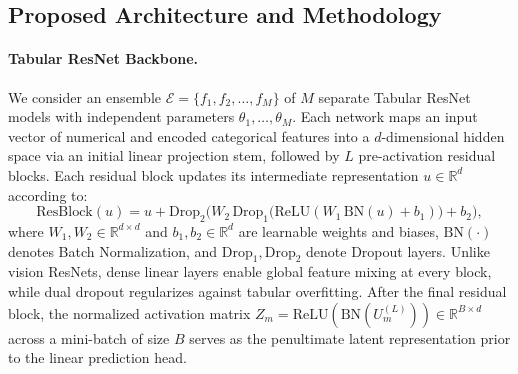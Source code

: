 \documentclass[11pt, a4paper]{article}
\begin{document}
\subsection{Proposed Architecture and Methodology}

\paragraph{Tabular ResNet Backbone.}
We consider an ensemble $\mathcal{E} = \{f_1, f_2, \dots, f_M\}$ of $M$ separate Tabular ResNet models \cite{grinsztajn2022why} with independent parameters $\theta_1, \dots, \theta_M$. Each network maps an input vector of numerical and encoded categorical features into a $d$-dimensional hidden space via an initial linear projection stem, followed by $L$ pre-activation residual blocks. Each residual block updates its intermediate representation $u \in \mathbb{R}^d$ according to:
\begin{equation}
    \text{ResBlock}(u) = u + \text{Drop}_2\Big(W_2 \, \text{Drop}_1\big(\text{ReLU}(W_1 \, \text{BN}(u) + b_1)\big) + b_2\Big),
\end{equation}
where $W_1, W_2 \in \mathbb{R}^{d \times d}$ and $b_1, b_2 \in \mathbb{R}^d$ are learnable weights and biases, $\text{BN}(\cdot)$ denotes Batch Normalization, and $\text{Drop}_1, \text{Drop}_2$ denote Dropout layers. Unlike vision ResNets, dense linear layers enable global feature mixing at every block, while dual dropout regularizes against tabular overfitting. After the final residual block, the normalized activation matrix $Z_m = \text{ReLU}(\text{BN}(U_m^{(L)})) \in \mathbb{R}^{B \times d}$ across a mini-batch of size $B$ serves as the penultimate latent representation prior to the linear prediction head.
\end{document}
